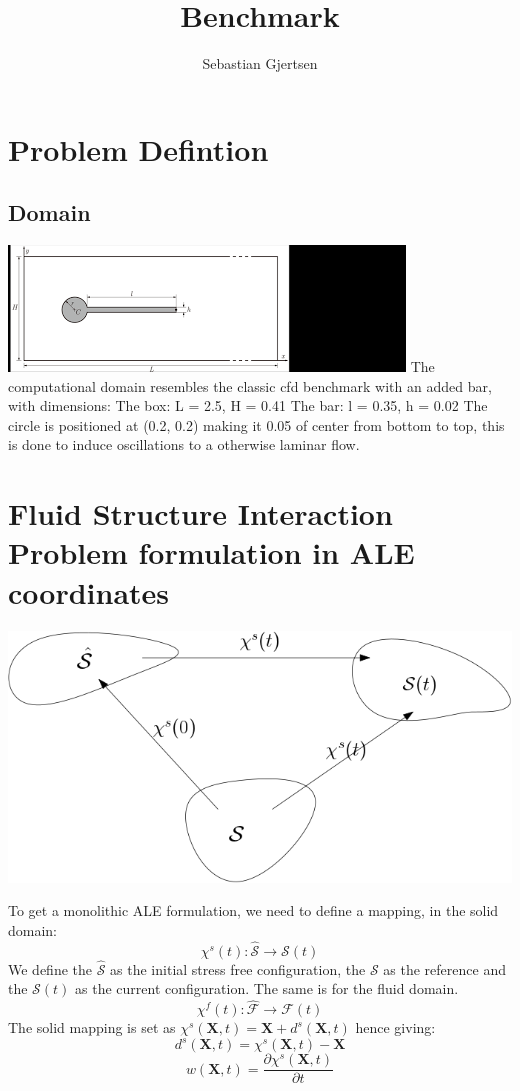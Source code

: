 
\usepackage{amsmath}                                    
\title{Benchmark}
\author{Sebastian Gjertsen}

\maketitle
\section*{Problem Defintion}
\subsection*{Domain}
\includegraphics[scale=0.9]{geometry.png}
The computational domain resembles the classic cfd benchmark with an added bar, with dimensions:
The box: L = 2.5, H = 0.41
The bar: l = 0.35, h = 0.02
The circle is positioned at (0.2, 0.2) making it 0.05 of center from bottom to top, this is done to induce oscillations to a otherwise laminar flow.

\section*{Fluid Structure Interaction Problem formulation in ALE coordinates}
\includegraphics[scale=0.4]{continuum_mapping.png}

To get a monolithic ALE formulation, we need to define a mapping, in the solid domain:
$$  \chi^s(t) : \hat{\mathcal{S}} \rightarrow \mathcal{S}(t)     $$ 
We define the $ \hat{\mathcal{S}}$ as the initial stress free configuration, the $\mathcal{S}$ as the reference and the $\mathcal{S}(t)$ as the current configuration.
The same is for the fluid domain.
$$  \chi^f(t) : \hat{\mathcal{F}} \rightarrow \mathcal{F}(t)     $$ 
The solid mapping is set as $\chi^s(\textbf{X},t) = \textbf{X}  + d^s(\textbf{X} ,t)$
hence giving:
$$  d^s(\textbf{X},t) = \chi^s(\textbf{X},t) -\textbf{X}   $$
$$  w(\textbf{X},t) = \frac{\partial \chi^s(\textbf{X},t)}{\partial t}   $$

